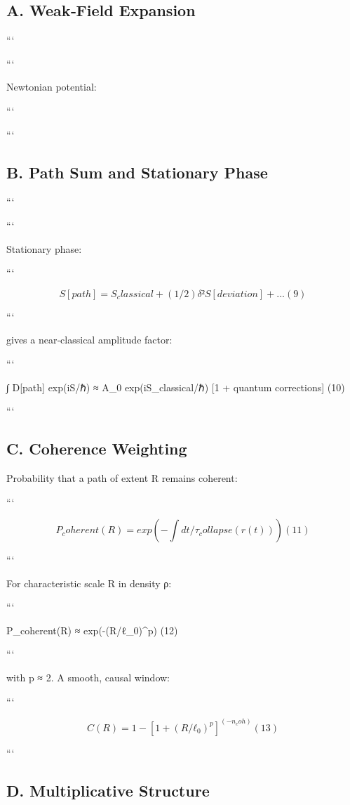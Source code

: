 \documentclass[11pt,a4paper]{article}
\begin{document}
\subsection{A. Weak‑Field Expansion}


```

```


Newtonian potential:

```

```


\subsection{B. Path Sum and Stationary Phase}


```

```


Stationary phase:

```

\[
S[path] = S_classical + (1/2)δ²S[deviation] + ...     (9)
\]

```


gives a near‑classical amplitude factor:

```

∫ D[path] exp(iS/ℏ) ≈ A\_0 exp(iS\_classical/ℏ) [1 + quantum corrections]     (10)

```


\subsection{C. Coherence Weighting}


Probability that a path of extent R remains coherent:

```

\[
P_coherent(R) = exp(-∫ dt/τ_collapse(r(t)))     (11)
\]

```


For characteristic scale R in density ρ:

```

P\_coherent(R) ≈ exp(-(R/ℓ\_0)^p)     (12)

```


with p ≈ 2. A smooth, causal window:

```

\[
C(R) = 1 - [1 + (R/ℓ_0)^p]^(-n_coh)     (13)
\]

```


\subsection{D. Multiplicative Structure}
\end{document}

